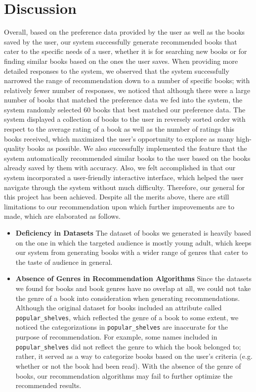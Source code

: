 \documentclass[fontsize=11pt]{article}
\begin{document}
\section*{Discussion}
Overall, based on the preference data provided by the user as well as the books saved by the user, our system successfully generate recommended books that cater to the specific needs of a user, whether it is for searching new books or for finding similar books based on the ones the user saves. When providing more detailed responses to the system, we observed that the system successfully narrowed the range of recommendation down to a number of specific books; with relatively fewer number of responses, we noticed that although there were a large number of books that matched the preference data we fed into the system, the system randomly selected 60 books that best matched our preference data. The system displayed a collection of books to the user in reversely sorted order with respect to the average rating of a book as well as the number of ratings this books received, which maximized the user's opportunity to explore as many high-quality books as possible. We also successfully implemented the feature that the system automatically recommended similar books to the user based on the books already saved by them with accuracy. Also, we felt accomplished in that our system incorporated a user-friendly interactive interface, which helped the user navigate through the system without much difficulty. Therefore, our general for this project has been achieved. Despite all the merits above, there are still limitations to our recommendation upon which further improvements are to made, which are elaborated as follows.
\begin{itemize}
    \item \textbf{Deficiency in Datasets} The dataset of books we generated is heavily based on the one in which the targeted audience is mostly young adult, which keeps our system from generating books with a wider range of genres that cater to the taste of audience in general.
    \item \textbf{Absence of Genres in Recommendation Algorithms} Since the datasets we found for books and book genres have no overlap at all, we could not take the genre of a book into consideration when generating recommendations. Although the original dataset for books included an attribute called \texttt{popular\_shelves}, which reflected the genre of a book to some extent, we noticed the categorizations in \texttt{popular\_shelves} are inaccurate for the purpose of recommendation. For example, some names included in \texttt{popular\_shelves} did not reflect the genre to which the book belonged to; rather, it served as a way to categorize books based on the user's criteria (e.g. whether or not the book had been read). With the absence of the genre of books, our recommendation algorithms may fail to further optimize the recommended results.
\end{itemize}
\end{document}
